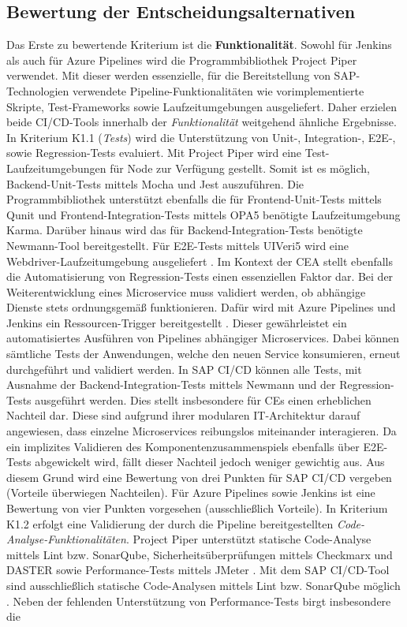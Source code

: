 \subsection{Bewertung der Entscheidungsalternativen}
\label{sec:Bewertung}
Das Erste zu bewertende Kriterium ist die \textbf{Funktionalität}. Sowohl für Jenkins als auch für Azure Pipelines wird die Programmbibliothek Project Piper verwendet. Mit dieser werden essenzielle, für die Bereitstellung von SAP-Technologien verwendete Pipeline-Funktionalitäten wie vorimplementierte Skripte, Test-Frameworks sowie Laufzeitumgebungen ausgeliefert. Daher erzielen beide CI/CD-Tools innerhalb der \textit{Funktionalität} weitgehend ähnliche Ergebnisse.\\ In Kriterium K1.1 (\textit{Tests}) wird die Unterstützung von Unit-, Integration-, E2E-, sowie Regression-Tests evaluiert. Mit Project Piper wird eine Test-Laufzeitumgebungen für Node zur Verfügung gestellt. Somit ist es möglich, Backend-Unit-Tests mittels Mocha und Jest auszuführen. Die Programmbibliothek unterstützt ebenfalls die für Frontend-Unit-Tests mittels Qunit und Frontend-Integration-Tests mittels OPA5 benötigte Laufzeitumgebung Karma. Darüber hinaus wird das für Backend-Integration-Tests benötigte Newmann-Tool bereitgestellt. Für E2E-Tests mittels UIVeri5 wird eine Webdriver-Laufzeitumgebung ausgeliefert \cite[Z. 66 ff.]{TestDeveloperSAPHyperspaceAdoption&Onboarding.}. Im Kontext der CEA stellt ebenfalls die Automatisierung von Regression-Tests einen essenziellen Faktor dar. Bei der Weiterentwicklung eines Microservice muss validiert werden, ob abhängige Dienste stets ordnungsgemäß funktionieren. Dafür wird mit Azure Pipelines und Jenkins ein Ressourcen-Trigger bereitgestellt \cite{Steved0x.20230410}\cite{.20230417}. Dieser gewährleistet ein automatisiertes Ausführen von Pipelines abhängiger Microservices. Dabei können sämtliche Tests der Anwendungen, welche den neuen Service konsumieren, erneut durchgeführt und validiert werden. In SAP CI/CD können alle Tests, mit Ausnahme der Backend-Integration-Tests mittels Newmann und der Regression-Tests ausgeführt werden. Dies stellt insbesondere für CEs einen erheblichen Nachteil dar. Diese sind aufgrund ihrer modularen IT-Architektur darauf angewiesen, dass einzelne Microservices reibungslos miteinander interagieren. Da ein implizites Validieren des Komponentenzusammenspiels ebenfalls über E2E-Tests abgewickelt wird, fällt dieser Nachteil jedoch weniger gewichtig aus. Aus diesem Grund wird eine Bewertung von drei Punkten für SAP CI/CD vergeben (Vorteile überwiegen Nachteilen). Für Azure Pipelines sowie Jenkins ist eine Bewertung von vier Punkten vorgesehen (ausschließlich Vorteile). In Kriterium K1.2 erfolgt eine Validierung der durch die Pipeline bereitgestellten \textit{Code-Analyse-Funktionalitäten}. Project Piper unterstützt statische Code-Analyse mittels Lint bzw. SonarQube, Sicherheitsüberprüfungen mittels Checkmarx und DASTER sowie Performance-Tests mittels JMeter \cite[Z. 40 ff.]{ProductManagerSAPHyperspaceSecurityTools.}. Mit dem SAP CI/CD-Tool sind ausschließlich statische Code-Analysen mittels Lint bzw. SonarQube möglich \cite[Z. 50 ff.]{ProductOwnerSAPBTPProd&Infra.}. Neben der fehlenden Unterstützung von Performance-Tests birgt insbesondere die 